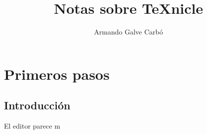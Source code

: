 \documentclass[11pt]{article}
\title{Notas sobre TeXnicle}
\author{Armando Galve Carbó}
\date{}
\begin{document}
\maketitle
\section{Primeros pasos}
\subsection{Introducción} El editor parece m
\end{document}
